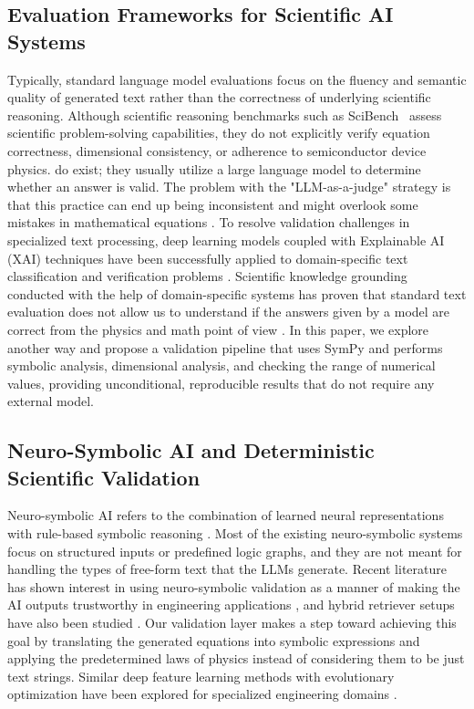 \documentclass[a4paper,fleqn]{cas-sc}
\begin{document}
\subsection{Evaluation Frameworks for Scientific AI Systems}
Typically, standard language model evaluations focus on the fluency and semantic quality of generated text rather than the correctness of underlying scientific reasoning. Although scientific reasoning benchmarks such as SciBench~\citep{SciBench} assess scientific problem-solving capabilities, they do not explicitly verify equation correctness, dimensional consistency, or adherence to semiconductor device physics. do exist; they usually utilize a large language model to determine whether an answer is valid. The problem with the "LLM-as-a-judge" strategy is that this practice can end up being inconsistent and might overlook some mistakes in mathematical equations \citep{Ali2023XAI}. To resolve validation challenges in specialized text processing, deep learning models coupled with Explainable AI (XAI) techniques have been successfully applied to domain-specific text classification and verification problems \citep{Amrita-Likha-2025}. Scientific knowledge grounding conducted with the help of domain-specific systems has proven that standard text evaluation does not allow us to understand if the answers given by a model are correct from the physics and math point of view \citep{INDUS2024}. In this paper, we explore another way and propose a validation pipeline that uses SymPy and performs symbolic analysis, dimensional analysis, and checking the range of numerical values, providing unconditional, reproducible results that do not require any external model.

\subsection{Neuro-Symbolic AI and Deterministic Scientific Validation}
Neuro-symbolic AI refers to the combination of learned neural representations with rule-based symbolic reasoning \citep{Garcez-NeuroSymbolic, XAI-Barredo}. Most of the existing neuro-symbolic systems focus on structured inputs or predefined logic graphs, and they are not meant for handling the types of free-form text that the LLMs generate. Recent literature has shown interest in using neuro-symbolic validation as a manner of making the AI outputs trustworthy in engineering applications \citep{Gaur2024}, and hybrid retriever setups have also been studied \citep{Doan2024Hybrid}. Our validation layer makes a step toward achieving this goal by translating the generated equations into symbolic expressions and applying the predetermined laws of physics instead of considering them to be just text strings. Similar deep feature learning methods with evolutionary optimization have been explored for specialized engineering domains \citep{Amrita-Anand-2026}.
\end{document}
